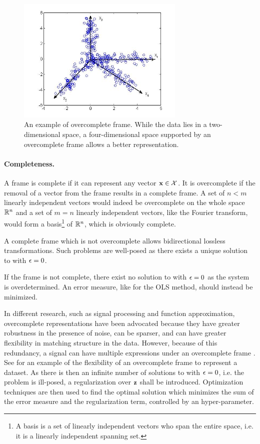 \begin{figure}[ht]
	\centering
	\includegraphics[height=6cm]{img/overcomplete_frame}
	\caption[]{An example of overcomplete frame. While the data lies in a two-dimensional space, a four-dimensional space supported by an overcomplete frame allows a better representation.\footnotemark}
	\label{fig:overcomplete_frame}
\end{figure}

\paragraph{Completeness.}
A frame is complete if it can represent any vector $\mathbf{x} \in \mathcal{X}$. It is overcomplete if the removal of a vector from the frame results in a complete frame. A set of $n < m$ linearly independent vectors would indeed be overcomplete on the whole space $\mathbb{R}^n$ and a set of $m=n$ linearly independent vectors, like the Fourier transform, would form a basis\footnote{A basis is a set of linearly independent vectors who span the entire space, i.e. it is a linearly independent spanning set.} of $\mathbb{R}^n$, which is obviously complete.

A complete frame which is not overcomplete allows bidirectional lossless transformations. Such problems are well-posed as there exists a unique solution to  with $\mathbf{\epsilon}=0$.

If the frame is not complete, there exist no solution to  with $\mathbf{\epsilon}=0$ as the system is overdetermined. An error measure, like  for the \gls{OLS} method, should instead be minimized.

In different research, such as signal processing and function approximation, overcomplete representations have been advocated because they have greater robustness in the presence of noise, can be sparser, and can have greater flexibility in matching structure in the data. However, because of this redundancy, a signal can have multiple expressions under an overcomplete frame \cite{lewicki2000overcompleteRepresentation}. See  for an example of the flexibility of an overcomplete frame to represent a dataset. As there is then an infinite number of solutions to  with $\mathbf{\epsilon}=0$, i.e. the problem is ill-posed, a regularization over $\mathbf{z}$ shall be introduced. Optimization techniques are then used to find the optimal solution which minimizes the sum of the error measure and the regularization term, controlled by an hyper-parameter.

